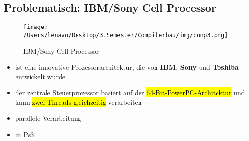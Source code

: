 \documentclass[a4paper, 10pt]{article}
\begin{document}
\subsection{Problematisch: IBM/Sony Cell Processor}
\begin{figure}[h]
    \centering
    \texttt{[image: /Users/lenavo/Desktop/3.Semester/Compilerbau/img/comp3.png]}
    \caption{IBM/Sony Cell Processor}
    \label{fig:enter-label}
\end{figure}

\begin{itemize}
    \item ist eine innovative Prozessorarchitektur, die von \textbf{IBM}, \textbf{Sony} und \textbf{Toshiba} entwickelt wurde
    \item der zentrale Steuerprozessor basiert auf der \hl{64-Bit-PowerPC-Architektur} und kann \hl{zwei Threads gleichzeitig} verarbeiten
    \item parallele Verarbeitung
    \item in Ps3
\end{itemize}
\end{document}
